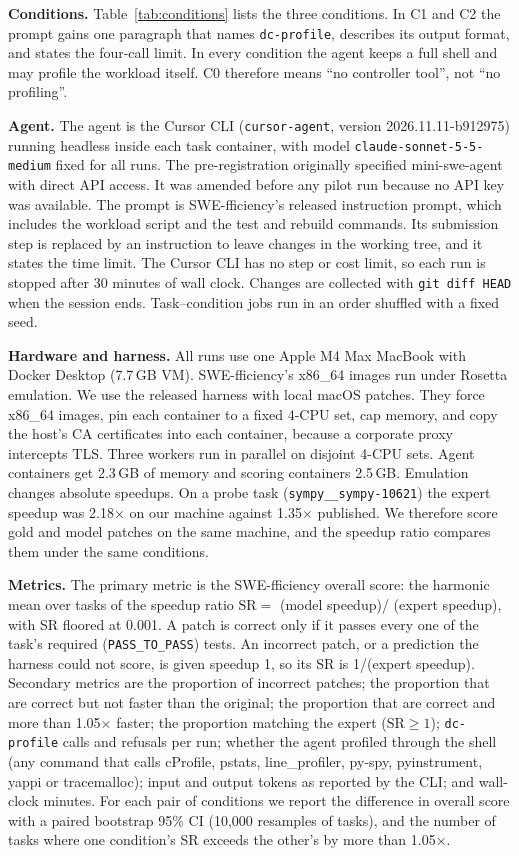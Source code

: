 \documentclass[conference]{IEEEtran}
\newcommand{\tool}{\texttt{dc-profile}}
\begin{document}
\textbf{Conditions.} Table~\ref{tab:conditions} lists the three conditions.
In C1 and C2 the prompt gains one paragraph that names \tool{}, describes its
output format, and states the four-call limit. In every condition the agent
keeps a full shell and may profile the workload itself. C0 therefore means
``no controller tool'', not ``no profiling''.

\textbf{Agent.} The agent is the Cursor CLI (\texttt{cursor-agent}, version
2026.11.11-b912975) running headless inside each task container, with model
\texttt{claude-sonnet-5-5-medium} fixed for all runs. The pre-registration
originally specified mini-swe-agent with direct API access. It was amended
before any pilot run because no API key was available. The prompt is
SWE-fficiency's released instruction prompt, which includes the workload
script and the test and rebuild commands. Its submission step is replaced by
an instruction to leave changes in the working tree, and it states the time
limit. The Cursor CLI has no step or cost limit, so each run is stopped after
30 minutes of wall clock. Changes are collected with \texttt{git diff HEAD}
when the session ends. Task--condition jobs run in an order shuffled with a
fixed seed.

\textbf{Hardware and harness.} All runs use one Apple M4 Max MacBook with
Docker Desktop (7.7\,GB VM). SWE-fficiency's x86\_64 images run under Rosetta
emulation. We use the released harness with local macOS patches. They force
x86\_64 images, pin each container to a fixed 4-CPU set, cap memory, and copy
the host's CA certificates into each container, because a corporate proxy
intercepts TLS. Three workers run in parallel on disjoint 4-CPU sets. Agent
containers get 2.3\,GB of memory and scoring containers 2.5\,GB. Emulation
changes absolute speedups. On a probe task (\texttt{sympy\_\_sympy-10621}) the
expert speedup was 2.18$\times$ on our machine against 1.35$\times$ published.
We therefore score gold and model patches on the same machine, and the speedup
ratio compares them under the same conditions.

\textbf{Metrics.} The primary metric is the SWE-fficiency overall score: the
harmonic mean over tasks of the speedup ratio $\mathrm{SR}=$ (model speedup)/
(expert speedup), with SR floored at 0.001. A patch is correct only if it
passes every one of the task's required (\texttt{PASS\_TO\_PASS}) tests. An
incorrect patch, or a prediction the harness could not score, is given speedup
1, so its SR is 1/(expert speedup). Secondary metrics are the proportion of incorrect patches; the
proportion that are correct but not faster than the original; the proportion
that are correct and more than 1.05$\times$ faster; the proportion matching
the expert ($\mathrm{SR}\ge1$); \tool{} calls and refusals per run; whether
the agent profiled through the shell (any command that calls cProfile,
pstats, line\_profiler, py-spy, pyinstrument, yappi or tracemalloc); input and
output tokens as reported by the CLI; and wall-clock minutes. For each pair of
conditions we report the difference in overall score with a paired bootstrap
95\% CI (10{,}000 resamples of tasks), and the number of tasks where one
condition's SR exceeds the other's by more than 1.05$\times$.
\end{document}
